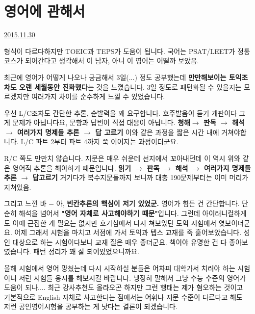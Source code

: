 \section{영어에 관해서}
\href{https://www.kockoc.com/Apoc/518404}{2015.11.30}

\vspace{5mm}

형식이 다르다하지만 TOEIC과 TEPS가 도움이 됩니다.
국어는 PSAT/LEET가 정통코스가 되어간다고 생각해서 이 남자, 아니 이 영어는 어떨까 보았음.
\vspace{5mm}

최근에 영어가 어떻게 나오나 궁금해서 3일(...) 정도 공부했는데
\textbf{만만해보이는 토익조차도 오랜 세월동안 진화했다}는 것을 느꼈습니다.
3일 정도로 패턴화될 수 있을지는 모르겠지만
여러가지 차이를 순수하게 느낄 수 있었습니다.
\vspace{5mm}

우선 L/C조차도 간단한 추론, 순발력을 꽤 요구합니다. 호주발음이 듣기 개판이다 그게 문제가 아닙니다요,
문항과 답변이 직접 대응이 아닙니다.
\textbf{청해$\rightarrow$ 판독 $\rightarrow$ 해석 $\rightarrow$ 여러가지 명제들 추론 $\rightarrow$ 답 고르기}
이와 같은 과정을 짧은 시간 내에 거쳐야합니다.
L/C 파트 2부터 파트 4까지 쭉 이어지는 과정이더군요.
\vspace{5mm}

R/C 쪽도 만만치 않습니다. 지문은 매우 쉬운데 선지에서 꼬아내던데
이 역시 위와 같은 영어적 추론을 해야하기 때문입니다.
\textbf{읽기 $\rightarrow$ 판독 $\rightarrow$ 해석 $\rightarrow$ 여러가지 명제들 추론 $\rightarrow$ 답고르기}
거기다가 복수지문들까지 보니까 대충 190문제부터는 이미 머리가 지쳐있음.
\vspace{5mm}

그리고 느낀 바 $-$ 아, \textbf{빈칸추론의 핵심이 저기 있었군.}
영어가 힘든 건 간단합니다. 단순히 해석을 넘어서 \textbf{"영어 자체로 사고해야하기 때문"}입니다.
그런데 아이러니컬하게도 이에 근접한 게 필요는 없지만 호기심에서 다시 쳐보았던 토익 시험에서 엿보이더군요.
어제 그래서 시험을 마치고 서점에 가서 토익과 텝스 교재를 죽 훑어보았습니다.
성인 대상으로 하는 시험이다보니 교재 질은 매우 좋더군요.
책이야 유명한 건 다 좋아보였습니다. 패턴 정리가 꽤 잘 되어있었으니까요.
\vspace{5mm}

올해 시험에서 영어 망쳤는데 다시 시작하실 분들은
어차피 대학가서 치러야 하는 시험이니 저런 시험들 응시를 해보시길 바랍니다.
냉정히 말해서 그냥 수능 수준의 영어가 도움이 되나.... 최근 강사추천도 올라오곤 하지만 그런 행태는 제가 혐오하는 것이고
기본적으로 English 자체로 사고한다는 점에서는 어휘나 지문 수준이 다르다고 해도 저런 공인영어시험을 공부하는 게 낫다는 결론이 되겠습니다.
\vspace{5mm}

